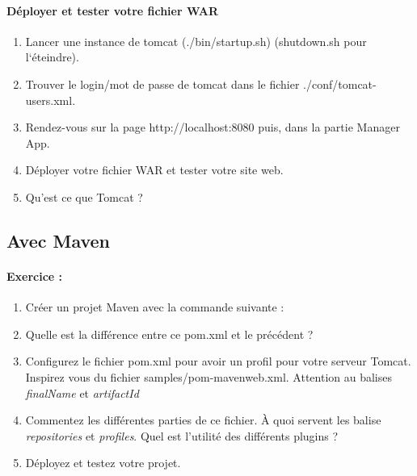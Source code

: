 \documentclass[a4,12pt]{article}
\begin{document}

\paragraph{Déployer et tester votre fichier WAR}
\begin{enumerate}
	\item Lancer une instance de tomcat (./bin/startup.sh) (shutdown.sh pour l`éteindre).
	\item Trouver le login/mot de passe de tomcat dans le fichier ./conf/tomcat-users.xml.
	\item Rendez-vous sur la page http://localhost:8080 puis, dans la partie Manager App.
	\item Déployer votre fichier WAR et tester votre site web.
	\item Qu'est ce que Tomcat ?
\end{enumerate}


\subsection{Avec Maven}

\paragraph{Exercice :}
\begin{enumerate}
	\item Créer un projet Maven avec la commande suivante :
	
	\item Quelle est la différence entre ce pom.xml et le précédent ?  
  	\item Configurez le fichier pom.xml pour avoir un profil pour votre serveur Tomcat. Inspirez vous du fichier samples/pom-mavenweb.xml. Attention au balises \emph{finalName} et \emph{artifactId}
	\item Commentez les différentes parties de ce fichier. À quoi servent les balise \emph{repositories} et \emph{profiles}. Quel est l'utilité des différents plugins ?
	\item Déployez et testez votre projet.

\end{enumerate}
\end{document}

